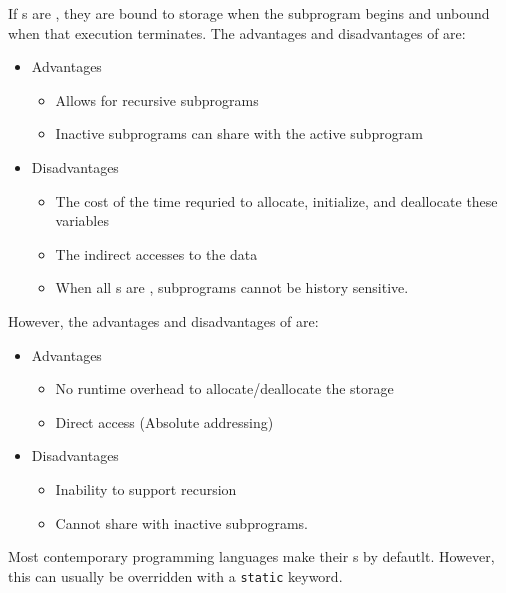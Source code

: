 If s are , they are bound to storage when the subprogram begins and unbound when that execution terminates.
The advantages and disadvantages of  are:
\begin{itemize}[noitemsep]
\item Advantages
  \begin{itemize}[noitemsep]
  \item Allows for recursive subprograms
  \item Inactive subprograms can share  with the active subprogram
  \end{itemize}
\item Disadvantages
  \begin{itemize}[noitemsep]
  \item The cost of the time requried to allocate, initialize, and deallocate these variables
  \item The indirect  accesses to the data
  \item When all s are , subprograms cannot be history sensitive.
  \end{itemize}
\end{itemize}

However, the advantages and disadvantages of  are:
\begin{itemize}[noitemsep]
\item Advantages
  \begin{itemize}[noitemsep]
  \item No runtime overhead to allocate/deallocate the storage
  \item Direct  access (Absolute addressing)
  \end{itemize}
\item Disadvantages
  \begin{itemize}[noitemsep]
  \item Inability to support recursion
  \item Cannot share  with inactive subprograms.
  \end{itemize}
\end{itemize}

Most contemporary programming languages make their s  by defautlt.
However, this can usually be overridden with a \texttt{static} keyword.

